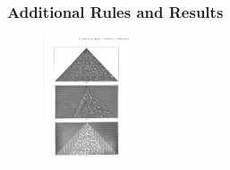 \documentclass{beamer}
\begin{document}
\frame
{
\frametitle{Additional Rules and Results}
\begin{figure}
\includegraphics[width = 100]{triangle}

\end{figure}}
\end{document}
